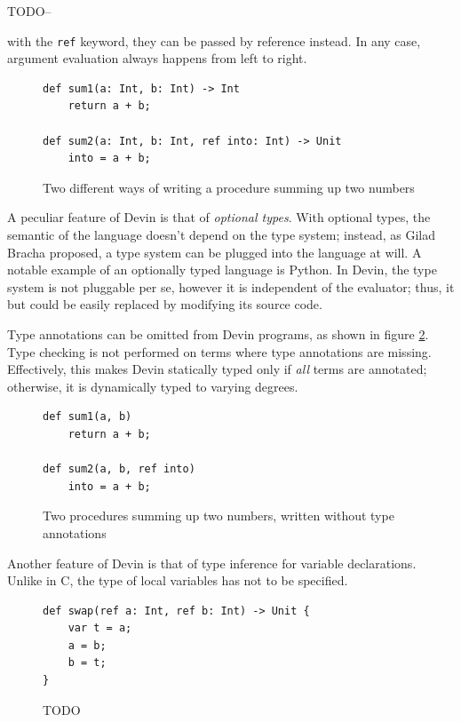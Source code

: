 \documentclass[11pt, american, draft]{PhdThesis}
\begin{document}
  TODO--

  with the \texttt{ref} keyword, they can be passed by reference instead. In any case, argument
  evaluation always happens from left to right.

  \begin{figure}[H]
    \center

    \begin{verbatim}
def sum1(a: Int, b: Int) -> Int
    return a + b;

def sum2(a: Int, b: Int, ref into: Int) -> Unit
    into = a + b;
    \end{verbatim}

    \caption{Two different ways of writing a procedure summing up two numbers}
    \label{ex2}
  \end{figure}

  A peculiar feature of Devin is that of \emph{optional types}. With optional types, the semantic of
  the language doesn't depend on the type system; instead, as Gilad Bracha proposed\cite{bracha}, a
  type system can be plugged into the language at will. A notable example of an optionally typed
  language is Python. In Devin, the type system is not pluggable per se, however it is independent
  of the evaluator; thus, it but could be easily replaced by modifying its source code.

  Type annotations can be omitted from Devin programs, as shown in figure \ref{ex3}. Type checking
  is not performed on terms where type annotations are missing. Effectively, this makes Devin
  statically typed only if \emph{all} terms are annotated; otherwise, it is dynamically typed to
  varying degrees.

  \begin{figure}[H]
    \center

    \begin{verbatim}
def sum1(a, b)
    return a + b;

def sum2(a, b, ref into)
    into = a + b;
    \end{verbatim}

    \caption{Two procedures summing up two numbers, written without type annotations}
    \label{ex3}
  \end{figure}

  Another feature of Devin is that of type inference for variable declarations. Unlike in C, the
  type of local variables has not to be specified.

  \begin{figure}[H]
    \center

    \begin{verbatim}
def swap(ref a: Int, ref b: Int) -> Unit {
    var t = a;
    a = b;
    b = t;
}
    \end{verbatim}

    \label{ex4}
    \caption{TODO}
  \end{figure}
\end{document}
